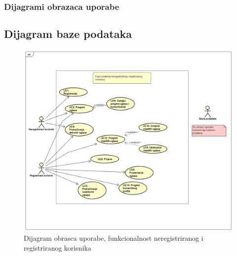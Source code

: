 					
					
				\subsubsection{Dijagrami obrazaca uporabe}
					
					\subsection{Dijagram baze podataka}
					
					\begin{figure}[H]
						\includegraphics[scale=0.45]{dijagrami/dijagrami obrazaca uporabe/uc dijagram 1} %
						\centering
						\caption{Dijagram obrasca uporabe, funkcionalnost neregistriranog i registriranog korisnika}
						\label{fig:ucDijagram1}
					\end{figure}
					
